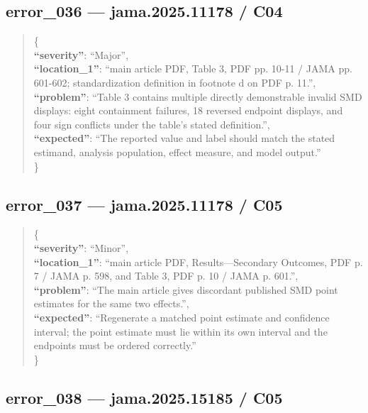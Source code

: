 \documentclass[
  letterpaper,
  9pt]{extreport}
\begin{document}
\hypertarget{error_036--jama202511178--c04}{%
\subsection{error\_036 --- jama.2025.11178 /
C04}\label{error_036--jama202511178--c04}}

\begin{quote}
\{\\
\textbf{``severity''}: ``Major'',\\
\textbf{``location\_1''}: ``main article PDF, Table 3, PDF pp. 10-11 /
JAMA pp. 601-602; standardization definition in footnote d on PDF p.
11.'',\\
\textbf{``problem''}: ``Table 3 contains multiple directly demonstrable
invalid SMD displays: eight containment failures, 18 reversed endpoint
displays, and four sign conflicts under the table's stated
definition.'',\\
\textbf{``expected''}: ``The reported value and label should match the
stated estimand, analysis population, effect measure, and model
output.''\\
\}
\end{quote}

\hypertarget{error_037--jama202511178--c05}{%
\subsection{error\_037 --- jama.2025.11178 /
C05}\label{error_037--jama202511178--c05}}

\begin{quote}
\{\\
\textbf{``severity''}: ``Minor'',\\
\textbf{``location\_1''}: ``main article PDF, Results---Secondary
Outcomes, PDF p. 7 / JAMA p. 598, and Table 3, PDF p. 10 / JAMA p.
601.'',\\
\textbf{``problem''}: ``The main article gives discordant published SMD
point estimates for the same two effects.'',\\
\textbf{``expected''}: ``Regenerate a matched point estimate and
confidence interval; the point estimate must lie within its own interval
and the endpoints must be ordered correctly.''\\
\}
\end{quote}

\hypertarget{error_038--jama202515185--c05}{%
\subsection{error\_038 --- jama.2025.15185 /
C05}\label{error_038--jama202515185--c05}}
\end{document}
